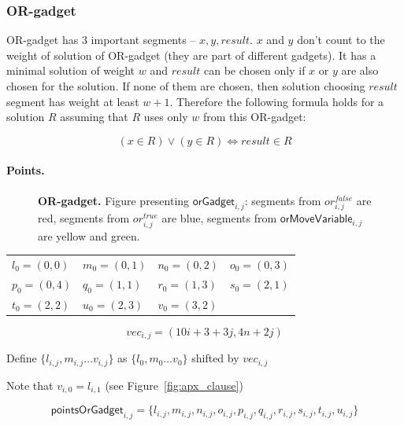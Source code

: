 \subsubsection{OR-gadget}

OR-gadget has 3 important segments
-- $x, y, result$. $x$ and $y$ don't count to the weight of solution
of OR-gadget (they are part of different gadgets).
It has a minimal solution of weight $w$
and $result$ can be chosen only if $x$ or $y$ are also chosen
for the solution.
If none of them are chosen, then solution
choosing $result$ segment has weight at least $w+1$.
Therefore the following formula holds for a solution $R$
assuming that $R$ uses only $w$ from this OR-gadget:

$$ (x \in R) \lor (y \in R) \iff result \in R  $$

\paragraph{Points.}

\begin{figure}[h]
\centering
\def\svgwidth{0.5\columnwidth}

\caption{
\textbf{OR-gadget.} Figure presenting $\mathsf{orGadget}_{i, j}$:
segments from $or^{false}_{i, j}$ are red,
segments from $or^{true}_{i, j}$ are blue,
segments from $\mathsf{orMoveVariable}_{i, j}$ are yellow and green.
}
\label{fig:apx_or_gadget}
\end{figure}

	\begin{center}
\begin{tabular}{ l l l l}

	$l_0 = (0, 0)$ &
	$m_0 = (0, 1)$ &
	$n_0 = (0, 2)$ &
	$o_0 = (0, 3)$ \\
	$p_0 = (0, 4)$ &
	$q_0 = (1, 1)$ &
	$r_0 = (1, 3)$ &
	$s_0 = (2, 1)$ \\
	$t_0 = (2, 2)$ &
	$u_0 = (2, 3)$ &
	$v_0 = (3, 2)$ &
\end{tabular}
\end{center}


	$$vec_{i, j} = (10i + 3 + 3j, 4n + 2j)$$
	
	Define 
	$\{ l_{i, j}, m_{i, j} \ldots v_{i, j} \}$
	as $\{l_0, m_0 \ldots v_0\}$ shifted by $vec_{i, j}$

Note that $v_{i, 0} = l_{i, 1}$ (see Figure~\ref{fig:apx_clause})
 
  $$\mathsf{pointsOrGadget}_{i, j} = 
 \{l_{i, j}, m_{i, j}, n_{i, j}, o_{i, j},
 p_{i, j}, q_{i, j}, r_{i, j}, s_{i, j}, t_{i, j}, u_{i, j} \}
 $$
 
